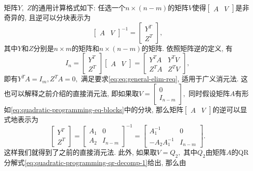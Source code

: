 \documentclass{SBCbookchapter}
\numberwithin{equation}{section}
\begin{document}
矩阵$Y,$ $Z$的通用计算格式如下: 任选一个$n \times (n - m)$的矩阵$V$使得$\begin{bmatrix} A & V \end{bmatrix}$是非奇异的, 且逆可以分块表示为
\begin{equation}
\label{eq:quadratic-programming-qr-decomp-general}
\begin{bmatrix} A & V \end{bmatrix}^{-1} = \begin{bmatrix} Y^T \\ Z^T \end{bmatrix},
\end{equation}
其中$Y$和$Z$分别是$n \times m$的矩阵和$n \times (n - m)$的矩阵. 依照矩阵逆的定义, 有
\begin{equation*}
I_n = \begin{bmatrix} Y^T \\ Z^T \end{bmatrix} \begin{bmatrix} A & V \end{bmatrix} = \begin{bmatrix} Y^T A & Y^T V \\ Z^T A & Z^T V \end{bmatrix},
\end{equation*}
即有$Y^T A = I_m, Z^T A = 0,$ 满足要求\eqref{eq:eq:general-elim-req}, 适用于广义消元法. 这也可以解释之前介绍的直接消元法, 即如果取$V = \begin{bmatrix} 0 \\ I_{n - m} \end{bmatrix},$ 同时假设矩阵$A$有形如\eqref{eq:quadratic-programming-eq-blocks}中的分块, 那么矩阵$\begin{bmatrix} A & V \end{bmatrix}$的逆可以显式地表示为
\begin{equation*}
\begin{bmatrix} Y^T \\ Z^T \end{bmatrix} = \begin{bmatrix} A_1 & 0 \\ A_2 & I_{n - m} \end{bmatrix}^{-1} = \begin{bmatrix} A_1^{-1} & 0 \\ -A_2A_1^{-1} & I_{n - m} \end{bmatrix}.
\end{equation*}
这样我们就得到了之前的直接消元法. 此外, 如果取$V = Q_2,$ 其中$Q_2$由矩阵$A$的QR分解式\eqref{eq:quadratic-programming-qr-decomp-1}给出, 那么由
\end{document}
